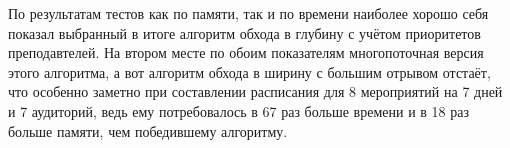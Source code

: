 По результатам тестов как по памяти, так и по времени наиболее хорошо себя показал выбранный в итоге алгоритм обхода в глубину с учётом приоритетов преподавтелей. На втором месте по обоим показателям многопоточная версия этого алгоритма, а вот алгоритм обхода в ширину с большим отрывом отстаёт, что особенно заметно при составлении расписания для 8 мероприятий на 7 дней и 7 аудиторий, ведь ему потребовалось в 67 раз больше времени и в 18 раз больше памяти, чем победившему алгоритму. 





